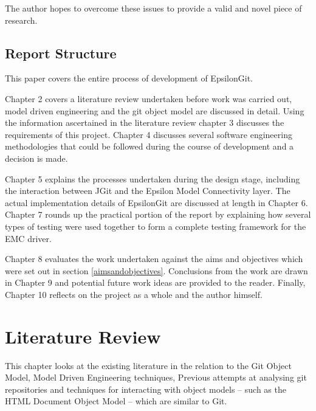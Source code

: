 \documentclass[11pt]{book}
\begin{document}
The author hopes to overcome these issues to provide a valid and novel piece of research.

\section{Report Structure}

This paper covers the entire process of development of EpsilonGit.

Chapter 2 covers a literature review undertaken before work was carried out, model driven engineering and the git object model are discussed in detail. Using the information ascertained in the literature review chapter 3 discusses the requirements of this project. Chapter 4 discusses several software engineering methodologies that could be followed during the course of development and a decision is made.

Chapter 5 explains the processes undertaken during the design stage, including the interaction between JGit and the Epsilon Model Connectivity layer. The actual implementation details of EpsilonGit are discussed at length in Chapter 6. Chapter 7 rounds up the practical portion of the report by explaining how several types of testing were used together to form a complete testing framework for the EMC driver.

Chapter 8 evaluates the work undertaken against the aims and objectives which were set out in section \ref{aimsandobjectives}. Conclusions from the work are drawn in Chapter 9 and potential future work ideas are provided to the reader. Finally, Chapter 10 reflects on the project as a whole and the author himself.  

\chapter{Literature Review}
		
\label{litreview}
This chapter looks at the existing literature in the relation to the Git Object Model, Model Driven Engineering techniques, Previous attempts at analysing git repositories and techniques for interacting with object models -- such as the HTML Document Object Model -- which are similar to Git.
\end{document}
